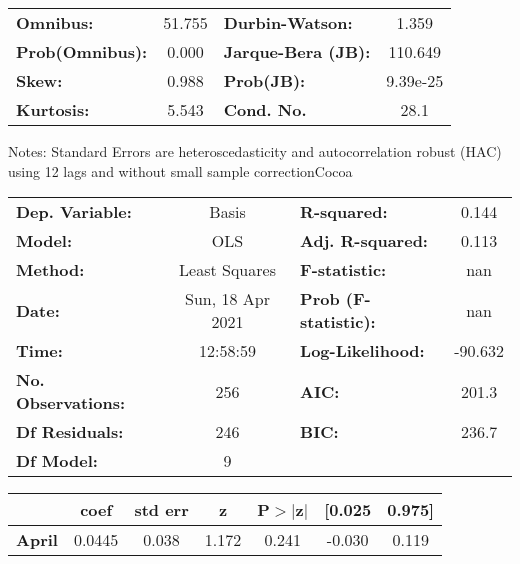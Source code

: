 \begin{center}
\begin{tabular}{lcccccc}
\bottomrule
\end{tabular}
\begin{tabular}{lclc}
\textbf{Omnibus:}       & 51.755 & \textbf{  Durbin-Watson:     } &    1.359  \\
\textbf{Prob(Omnibus):} &  0.000 & \textbf{  Jarque-Bera (JB):  } &  110.649  \\
\textbf{Skew:}          &  0.988 & \textbf{  Prob(JB):          } & 9.39e-25  \\
\textbf{Kurtosis:}      &  5.543 & \textbf{  Cond. No.          } &     28.1  \\
\bottomrule
\end{tabular}
\end{center}

Notes: \newline
 [1] Standard Errors are heteroscedasticity and autocorrelation robust (HAC) using 12 lags and without small sample correctionCocoa\begin{center}
\begin{tabular}{lclc}
\toprule
\textbf{Dep. Variable:}    &      Basis       & \textbf{  R-squared:         } &     0.144   \\
\textbf{Model:}            &       OLS        & \textbf{  Adj. R-squared:    } &     0.113   \\
\textbf{Method:}           &  Least Squares   & \textbf{  F-statistic:       } &       nan   \\
\textbf{Date:}             & Sun, 18 Apr 2021 & \textbf{  Prob (F-statistic):} &      nan    \\
\textbf{Time:}             &     12:58:59     & \textbf{  Log-Likelihood:    } &   -90.632   \\
\textbf{No. Observations:} &         256      & \textbf{  AIC:               } &     201.3   \\
\textbf{Df Residuals:}     &         246      & \textbf{  BIC:               } &     236.7   \\
\textbf{Df Model:}         &           9      & \textbf{                     } &             \\
\bottomrule
\end{tabular}
\begin{tabular}{lcccccc}
                   & \textbf{coef} & \textbf{std err} & \textbf{z} & \textbf{P$> |$z$|$} & \textbf{[0.025} & \textbf{0.975]}  \\
\midrule
\textbf{April}     &       0.0445  &        0.038     &     1.172  &         0.241        &       -0.030    &        0.119     \\

\end{tabular}
\end{center}
